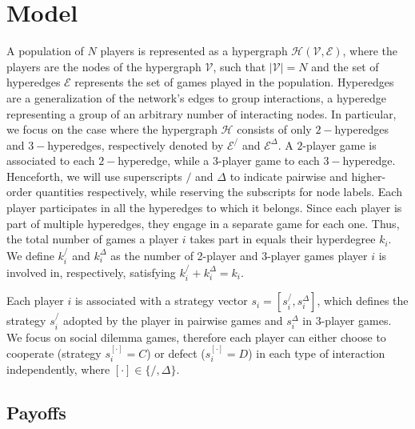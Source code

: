 \documentclass[a4paper,pre,reqno,superscriptaddress,twocolumn, floatfix]{revtex4}
\begin{document}
\section{Model}\label{sec:model}


A population of $N$ players is represented as a hypergraph $\mathcal{H}(\mathcal{V}, \mathcal{E})$, where the players are the nodes of the hypergraph $\mathcal{V}$, such that $|\mathcal{V}|=N$ and the set of hyperedges $\mathcal{E}$ represents the set of games played in the population.
%
Hyperedges are a generalization of the network's edges to group interactions, a hyperedge representing a group of an arbitrary number of interacting nodes.
%
In particular, we focus on the case where the hypergraph $\mathcal{H}$ consists of only $2-$hyperedges and $3-$hyperedges, respectively denoted by $\mathcal{E}^/$  and $\mathcal{E}^{\Delta}$. A $2$-player game is associated to each $2-$hyperedge, while a $3$-player game to each $3-$hyperedge. Henceforth, we will use superscripts $/$ and $\Delta$ to indicate pairwise and higher-order quantities respectively, while reserving the subscripts for node labels.
%
Each player participates in all the hyperedges to which it belongs. Since each player is part of multiple hyperedges, they engage in a separate game for each one. Thus, the total number of games a player $i$ takes part in equals their hyperdegree $k_i$. We define $k_i^/$ and $k_i^{\Delta}$  as the number of 2-player and 3-player games player $i$ is involved in, respectively, satisfying $k_i^/ + k_i^{\Delta} = k_i$.
%

Each player $i$ is associated with a strategy vector $s_i = [s_i^/, s_i^{\Delta}]$, which defines the strategy $s_i^/$ adopted by the player in pairwise games and  $s_i^{\Delta}$ in $3$-player games.
%
We focus on social dilemma games, therefore each player can either choose to cooperate (strategy $s_i^{[\cdot]} = C$) or defect ($s_i^{[\cdot]}=D$) in each type of interaction independently, where $[\cdot] \in \{/, \Delta\}$.
%


\subsection{Payoffs}\label{sec:payoff}
\end{document}
